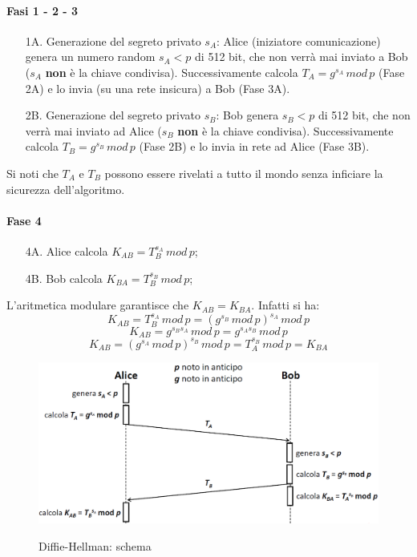 \paragraph{Fasi 1 - 2 - 3}
\begin{enumerate}
\item [1A.] Generazione del segreto privato $s_{A}$: Alice (iniziatore comunicazione) genera un numero random $s_{A}<p$ di 512 bit, che non verrà mai inviato a Bob ($s_A$ \textbf{non} è la chiave condivisa). Successivamente calcola $T_{A}=g^{s_{A}} \, mod \,p$ (Fase 2A) e lo invia (su una rete insicura) a Bob (Fase 3A).
\item [2B.] Generazione del segreto privato $s_{B}$: Bob genera $s_{B}<p$ di 512 bit, che non verrà mai inviato ad Alice ($s_B$ \textbf{non} è la chiave condivisa). Successivamente calcola $T_{B}=g^{s_{B}} \, mod \, p$ (Fase 2B) e lo invia in rete ad Alice (Fase 3B).
\end{enumerate}
Si noti che $T_A$ e $T_B$ possono essere rivelati a tutto il mondo senza inficiare la sicurezza dell'algoritmo.
\paragraph{Fase 4}
\begin{enumerate}
\item [4A.] Alice calcola $K_{AB}=T_{B}^{s_{A}} \, mod \,p$;
\item [4B.] Bob calcola $K_{BA}=T_{B}^{s_{B}} \, mod \, p$;
\end{enumerate}
L'aritmetica modulare garantisce che $K_{AB}=K_{BA}$. Infatti si ha:
\begin{equation}
K_{AB} = T_{B}^{s_{A}} \, mod \,p = ({g^{s_{B}} \, mod \, p})^{s_{A}} \, mod \,p
\end{equation}
\begin{equation}
K_{AB} = g^{s_{B}s_{A}} \, mod \, p = g^{s_{A}s_{B}} \, mod \, p
\end{equation} 
\begin{equation}
K_{AB} = ({g^{s_{A}} \, mod \, p})^{s_{B}} \, mod \,p = T_{A}^{s_{B}} \, mod \, p = K_{BA}
\end{equation}
\begin{figure}[htbp]
	\centering%
	\subfigure%
	{\includegraphics[scale=0.5, keepaspectratio]{Immagini/chiave_pubblica/DiffieHellman_schema.png}}
	\caption{Diffie-Hellman: schema}
\end{figure}

